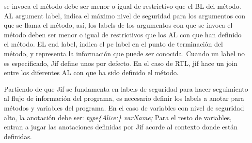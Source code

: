 se invoca el método debe ser menor o igual de restrictivo que el BL del
método.\newline 
AL argument label, indica el máximo nivel de seguridad  para los argumentos con
que se llama el método, así, los labels de los argumentos con que se invoca el
método deben ser menor o igual de restrictivos que los AL con que han
definido el método.\newline
EL end label, indica el pc label en el punto de terminación del método, y
representa la información que puede ser conocida.\newline
Cuando un label no es especificado, Jif define unos por defecto. En el caso de
RTL, jif hace un join entre los diferentes AL con que ha sido definido el
método.\newline

Partiendo de que Jif se fundamenta en labels de seguridad para hacer seguimiento
al flujo de información del programa, es necesario definir los labels a
anotar para métodos y variables del programa.\newline
En el caso de variables con nivel de seguridad  alto, la anotación debe
ser:\newline
\emph{ type\{Alice:\} varName; }\newline
Para el resto de variables, entran a jugar las anotaciones definidas por Jif
acorde al contexto donde están definidas.

